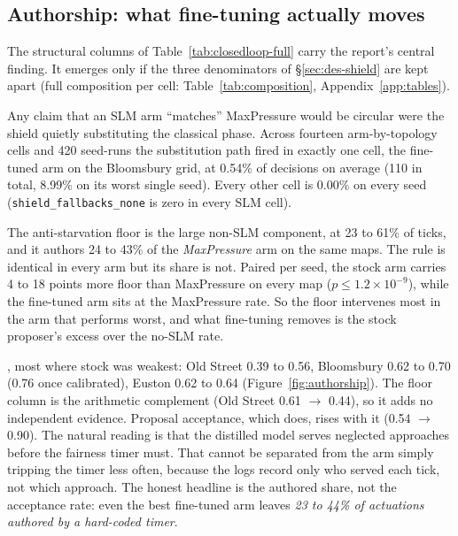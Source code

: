 \subsection{Authorship: what fine-tuning actually moves}\label{sec:res-authorship}
The structural columns of Table~\ref{tab:closedloop-full} carry the
report's central finding. It emerges only if the three denominators of
\S\ref{sec:des-shield} are kept apart (full composition per cell:
Table~\ref{tab:composition}, Appendix~\ref{app:tables}).

Any claim that an SLM arm ``matches'' MaxPressure would be circular were
the shield quietly substituting the classical phase. 
Across fourteen arm-by-topology cells and 420 seed-runs the substitution
path fired in exactly one cell, the fine-tuned arm on the Bloomsbury grid,
at 0.54\% of decisions on average (110 in total, 8.99\% on its worst
single seed). Every other cell is 0.00\% on every seed
(\texttt{shield\_fallbacks\_none} is zero in every SLM cell).

The anti-starvation floor is the large non-SLM component, at 23 to 61\% of
ticks, and it authors 24 to 43\% of the \emph{MaxPressure} arm on the same
maps. The rule is identical in every arm but its share is not. Paired per
seed, the stock arm carries 4 to 18 points more floor than MaxPressure on
every map ($p\le1.2{\times}10^{-9}$), while the fine-tuned arm sits at the
MaxPressure rate. So the floor intervenes most in the arm that performs
worst, and what fine-tuning removes is the stock proposer's excess over
the no-SLM rate.

, most
where stock was weakest: Old Street 0.39 to 0.56, Bloomsbury 0.62 to 0.70
(0.76 once calibrated), Euston 0.62 to 0.64 (Figure~\ref{fig:authorship}).
The floor column is the arithmetic complement (Old Street 0.61 $\to$
0.44), so it adds no independent evidence. Proposal acceptance, which
does, rises with it (0.54 $\to$ 0.90). The natural reading is that the
distilled model serves neglected approaches before the fairness timer
must. That cannot be separated from the arm simply tripping the timer less
often, because the logs record only who served each tick, not which
approach. The honest headline is the authored share, not the acceptance
rate: even the best fine-tuned arm leaves \emph{23 to 44\% of actuations
authored by a hard-coded timer}.

